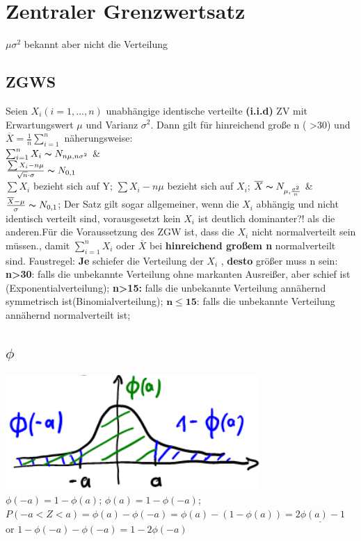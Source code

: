 \section{Zentraler Grenzwertsatz}
$\mu \sigma^2$ bekannt aber nicht die Verteilung
\subsection{ZGWS}
Seien $ X_{i} (i=1, ..., n)$ unabhängige identische verteilte \textbf{(i.i.d)} ZV mit Erwartungswert $\mu$ und Varianz
$ \sigma^2 $. Dann gilt für hinreichend große n ( >30) und $\overline{X} = \frac{1}{n} \sum_{i=1}^{n}$ näherungsweise:\\
$\sum_{i=1}^{n} X_{i}  \thicksim  N_{n\mu, n\sigma^2}$  \&\\
$\frac{\sum X_{i}-n\mu}{\sqrt{n}\cdot \sigma} \thicksim N_{0,1} $\\
$\sum X_{i} $ bezieht sich auf Y; $\sum X_{i} - n\mu$ bezieht sich auf $ X_{i}$; 
$ \overline{X} \thicksim N_{\mu, \frac{\sigma^2}{n}} $ \& $ \frac{\overline{X}-\mu}{\sigma} \thicksim N_{0,1} $; 
Der Satz gilt sogar allgemeiner, wenn die $X_{i}$ abhängig und nicht identisch verteilt sind, vorausgesetzt kein $ X_{i} $ ist deutlich dominanter?! als die anderen.Für die Voraussetzung des  ZGW ist, dass die $ X_{i} $ nicht normalverteilt sein müssen., damit $\sum_{i=1}^{n} X_{i}$ oder $\overline{X}$  bei \textbf{hinreichend großem n} normalverteilt sind. Faustregel: \textbf{Je} schiefer die Verteilung der $ X_{i}$ , \textbf{desto} größer muss n sein: 
\textbf{n>30}: falls die unbekannte Verteilung ohne markanten Ausreißer, aber schief ist (Exponentialverteilung); 
\textbf{n>15:} falls die unbekannte Verteilung annähernd symmetrisch ist(Binomialverteilung); 
$ \boldsymbol{ n \le 15 }$: falls die unbekannte Verteilung annähernd normalverteilt ist; 
\subsection{$\phi$}
\includegraphics[scale=0.25]{./pic/ZGWPhiVerteilung.png} $ \phi(-a ) = 1 - \phi(a) $; $\phi(a) = 1-\phi(-a) $; 
$ P(-a < Z < a) = \phi(a) - \phi(-a) = \phi(a) - (1-\phi(a)) = \underline{ 2\phi(a) -1 } $ or $ 1-\phi(-a) - \phi(-a) = 1 -2\phi(-a)$
